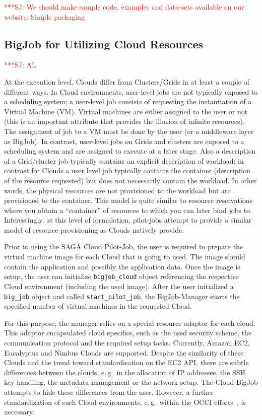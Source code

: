 \documentclass[conference,final]{IEEEtran}
\newcommand{\jhanote}[1]{ {\textcolor{red} { ***SJ: #1 }}}
\newcommand{\jhanote}[1]{}
\begin{document}
\jhanote{We should make sample code, examples and data-sets available
  on our website. Simple packaging}

\subsection{BigJob for Utilizing Cloud Resources} \jhanote{AL}


At the execution level, Clouds differ from Clusters/Grids in at least
a couple of different ways. In Cloud environments, user-level jobs are
not typically exposed to a scheduling system; a user-level job
consists of requesting the instantiation of a Virtual Machine (VM).
Virtual machines are either assigned to the user or not (this is an
important attribute that provides the illusion of infinite resources).
The assignment of job to a VM must be done by the user (or a
middleware layer as BigJob).  In contrast, user-level jobs on Grids
and clusters are exposed to a scheduling system and are assigned to
execute at a later stage.  Also a description of a Grid/cluster job
typically contains an explicit description of workload; in contrast
for Clouds a user level job typically contains the container
(description of the resource requested) but does not necessarily
contain the workload. In other words, the physical resources are not
provisioned to the workload but are provisioned to the container.
This model is quite similar to resource reservations where you obtain
a ``container'' of resources to which you can later bind jobs
to. Interestingly, at this level of formulation, pilot-jobs attempt to
provide a similar model of resource provisioning as Clouds natively
provide.

Prior to using the SAGA Cloud Pilot-Job, the user is required to
prepare the virtual machine image for each Cloud that is going to
used. The image should contain the application and possibly the
application data. Once the image is setup, the user can initialize
\texttt{bigjob\_cloud} object referencing the respective Cloud
environment (including the used image). After the user initialized 
a \texttt{big\_job} object and called \texttt{start\_pilot\_job},
the BigJob-Manager starts the specified number of virtual machines in the requested
Cloud. 

For this purpose, the manager relies on a special resource adaptor
for each cloud. This adaptor encapsulated cloud specifics, such as the used
security scheme, the communication protocol and the required setup tasks. Currently,
Amazon EC2, Eucalyptus and Nimbus Clouds are supported. Despite the similarity 
of these Clouds and the trend toward standardisation on the
EC2 API, there are subtle differences between the clouds, e.\,g.\ in the allocation
of IP addresses, the SSH key handling, the metadata management or 
the network setup. The Cloud BigJob attempts to hide these differences 
from the user. However, a further standardization of such Cloud environments, 
e.\,g.\ within the OCCI efforts~\cite{occi}, is necessary.
\end{document}
